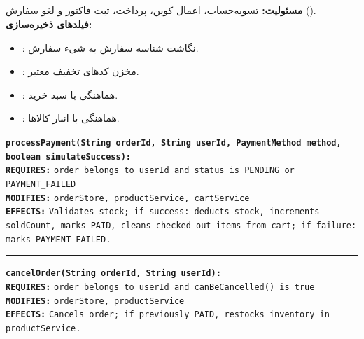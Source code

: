\documentclass[11pt,a4paper]{article}
\begin{document}
\subsection{}
\textbf{مسئولیت:} تسویه‌حساب، اعمال کوپن، پرداخت، ثبت فاکتور و لغو سفارش ().\\
\textbf{فیلدهای ذخیره‌سازی:}
\begin{itemize}
    \item {}: نگاشت شناسه سفارش به شیء سفارش.
    \item {}: مخزن کدهای تخفیف معتبر.
    \item {}: هماهنگی با سبد خرید.
    \item {}: هماهنگی با انبار کالاها.
\end{itemize}
\begin{contractbox}
\begin{latin}
\setlength{\parindent}{0pt}
\setlength{\parskip}{2pt}
\small
\textbf{\color{autnavy}\texttt{processPayment(String orderId, String userId, PaymentMethod method, boolean simulateSuccess):}} \\
\hspace*{1.5em}\textbf{\color{darkred}\texttt{REQUIRES:}} \texttt{order belongs to userId and status is PENDING or PAYMENT\_FAILED} \\
\hspace*{1.5em}\textbf{\color{autblue}\texttt{MODIFIES:}} \texttt{orderStore, productService, cartService} \\
\hspace*{1.5em}\textbf{\color{autteal}\texttt{EFFECTS:}}  \texttt{Validates stock; if success: deducts stock, increments soldCount, marks PAID, cleans checked-out items from cart; if failure: marks PAYMENT\_FAILED.}

\vspace{4pt}\hrule\vspace{4pt}

\textbf{\color{autnavy}\texttt{cancelOrder(String orderId, String userId):}} \\
\hspace*{1.5em}\textbf{\color{darkred}\texttt{REQUIRES:}} \texttt{order belongs to userId and canBeCancelled() is true} \\
\hspace*{1.5em}\textbf{\color{autblue}\texttt{MODIFIES:}} \texttt{orderStore, productService} \\
\hspace*{1.5em}\textbf{\color{autteal}\texttt{EFFECTS:}}  \texttt{Cancels order; if previously PAID, restocks inventory in productService.}
\end{latin}
\end{contractbox}
\end{document}
